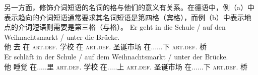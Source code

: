 \eal
{}
\zl
另一方面，修饰介词短语的名词的格与他们的意义有关系。在德语中，例（a）中表示趋向的介词短语通常要求其名词短语是第四格（宾格），而例（b）中表示地点的介词短语则需要是第三格（与格）。
\eal
\ex
\gll Er geht in die Schule / auf den Weihnachtsmarkt / unter die Brücke.\\
	 他 去 在 \textsc{art}.\textsc{def}.\acc{} 学校 {} 在 \textsc{art}.\textsc{def}.\acc{} 圣诞市场 {} 在......下 \textsc{art}.\textsc{def}.\acc{} 桥\\
\ex 
\gll Er schläft in der Schule / auf dem Weihnachtsmarkt / unter der Brücke.\\
	 他 睡觉 在.....里 \textsc{art}.\textsc{def}.\dat{} 学校 {} 在.....上 \textsc{art}.\textsc{def}.\dat{} 圣诞市场 {} 在......下 \textsc{art}.\textsc{def}.\dat{} 桥\\
\zl


